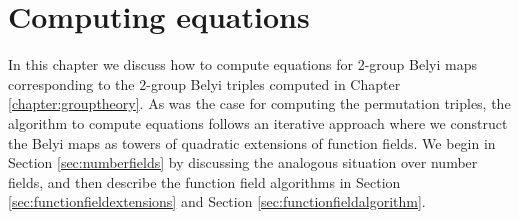\documentclass{dcthesis}
\numberwithin{equation}{section}
\theoremstyle{definition}
\theoremstyle{remark}
\begin{document}
\chapter{Computing equations}{\label{chapter:equations}
  In this chapter we discuss how to compute
  equations for $2$-group Belyi maps
  corresponding to the $2$-group Belyi triples
  computed in Chapter
  \ref{chapter:grouptheory}.
  As was the case for computing the permutation
  triples,
  the algorithm to compute equations follows an
  iterative approach where we
  construct the Belyi maps
  as towers of quadratic extensions
  of function fields.
  We begin in Section
  \ref{sec:numberfields}
  by discussing the analogous situation
  over number fields,
  and then describe the function field
  algorithms in Section
  \ref{sec:functionfieldextensions}
  and Section
  \ref{sec:functionfieldalgorithm}.
}
\end{document}
